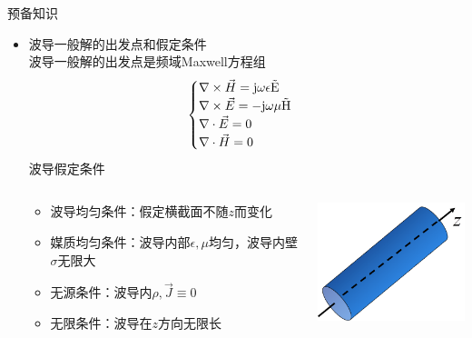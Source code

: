\begin{frame}{预备知识}
    \begin{itemize}
        \item 波导一般解的出发点和假定条件\\
              波导一般解的出发点是频域Maxwell方程组
              \begin{align}
                  \begin{cases}
                      \nabla\times\vec{H}=\rm{j}\omega\epsilon\vec{E} \\
                      \nabla\times\vec{E}=-\rm{j}\omega\mu\vec{H}     \\
                      \nabla\cdot\vec{E}=0                            \\
                      \nabla\cdot\vec{H}=0
                  \end{cases}
                  \label{eqn6-1}
              \end{align}
              波导假定条件
              \begin{columns}
                  \begin{column}{0.5\linewidth}
                      \begin{itemize}
                          \item 波导均匀条件：假定横截面不随$z$而变化
                          \item 媒质均匀条件：波导内部$\epsilon,\mu$均匀，波导内壁$\sigma$无限大
                          \item 无源条件：波导内$\rho,\vec{J}\equiv 0$
                          \item 无限条件：波导在$z$方向无限长
                      \end{itemize}
                  \end{column}
                  \begin{column}{0.5\linewidth}
                      \includegraphics[width=5cm]{Cha6//fig6-1.png}
                  \end{column}
              \end{columns}
    \end{itemize}
\end{frame}

